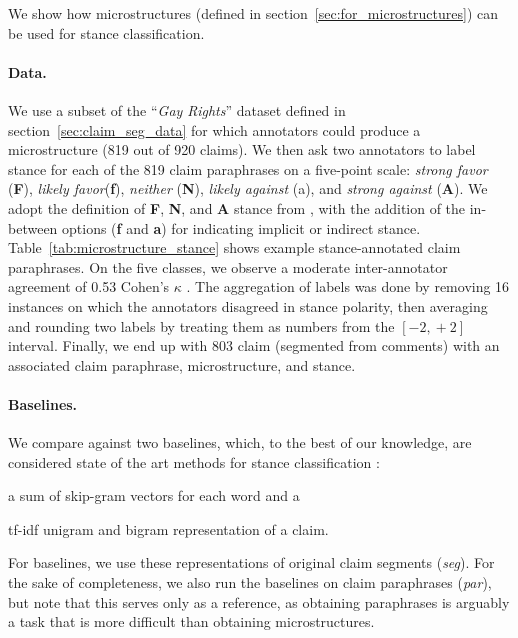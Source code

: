 We show how microstructures (defined in section~\ref{sec:for_microstructures})
can be used for stance classification. 

\paragraph{Data.} We use a subset  of the ``\emph{Gay Rights}'' dataset defined in
section~\ref{sec:claim_seg_data} for which annotators could produce 
a microstructure (819 out of 920 claims). We then ask two annotators to label
stance for each of the 819 claim paraphrases on a five-point scale:
\emph{strong favor} (\textbf{F}), \emph{likely favor}(\textbf{f}), \emph{neither} (\textbf{N}),
\emph{likely against} (a), and \emph{strong against} (\textbf{A}). 
We adopt the definition of \textbf{F}, \textbf{N}, and \textbf{A} stance from 
\citep{mohammad2016semeval}, with the addition of the in-between options
(\textbf{f} and \textbf{a}) for indicating implicit or indirect stance. 
Table~\ref{tab:microstructure_stance} shows example stance-annotated  
claim paraphrases. On the five classes, we observe a moderate inter-annotator
agreement of 0.53 Cohen's $\kappa$ \citep{cohen1960coefficient}.
The aggregation of labels was done by removing 16 instances on which the
annotators disagreed in stance polarity, then averaging and rounding two labels
by treating them as numbers from the $[-2, \mathop{+}2]$ interval.
Finally, we end up with 803 claim (segmented from comments) with an 
associated claim paraphrase, microstructure, and stance. 

\paragraph{Baselines.} 
We compare against two baselines, which, to the best of our knowledge, are
considered state of the art methods for stance classification
\citep{sobhani2016detecting}: 
\begin{enumerate*}[label=(\arabic*)]
\item a sum of skip-gram vectors \citep{mikolov2013distributed} for each word
and a
\item tf-idf unigram and bigram representation of a claim.
\end{enumerate*}
For baselines, we use these representations of original claim segments
(\emph{seg}). For the sake of completeness, we also run 
the baselines on claim paraphrases (\emph{par}), but note that this serves
only as a reference, as obtaining paraphrases is arguably a task 
that is more difficult than obtaining microstructures. 

